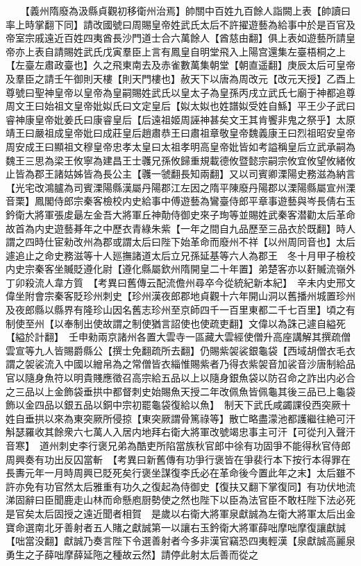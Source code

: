 　　【義州隋廢為汲縣貞觀初移衛州治焉】帥關中百姓九百餘人詣闕上表【帥讀曰率上時掌翻下同】請改國號曰周賜皇帝姓武氏太后不許擢遊藝為給事中於是百官及帝室宗戚遠近百姓四夷酋長沙門道士合六萬餘人【酋慈由翻】俱上表如遊藝所請皇帝亦上表自請賜姓武氏戊寅羣臣上言有鳳皇自明堂飛入上陽宫還集左臺梧桐之上【左臺左肅政臺也】久之飛東南去及赤雀數萬集朝堂【朝直遥翻】庚辰太后可皇帝及羣臣之請壬午御則天樓【則天門樓也】赦天下以唐為周改元【改元天授】乙酉上尊號曰聖神皇帝以皇帝為皇嗣賜姓武氏以皇太子為皇孫丙戌立武氏七廟于神都追尊周文王曰始祖文皇帝妣姒氏曰文定皇后【姒太姒也姓譜姒受姓自鯀】平王少子武曰睿神康皇帝妣姜氏曰康睿皇后【后遠祖姬周誣神甚矣文王其肯饗非鬼之祭乎】太原靖王曰嚴祖成皇帝妣曰成莊皇后趙肅恭王曰肅祖章敬皇帝魏義康王曰烈祖昭安皇帝周安成王曰顯祖文穆皇帝忠孝太皇曰太祖孝明高皇帝妣皆如考謚稱皇后立武承嗣為魏王三思為梁王攸寧為建昌王士彠兄孫攸歸重規載德攸暨懿宗嗣宗攸宜攸望攸緒攸止皆為郡王諸姑姊皆為長公主【彠一虢翻長知兩翻】又以司賓卿溧陽史務滋為納言【光宅改鴻臚為司賓溧陽縣漢屬丹陽郡江左因之隋平陳廢丹陽郡以溧陽縣屬宣州溧音栗】鳳閣侍郎宗秦客檢校内史給事中傅遊藝為鸞臺侍郎平章事遊藝與岑長倩右玉鈐衛大將軍張䖍朂左金吾大將軍丘神勣侍御史來子珣等並賜姓武秦客潜勸太后革命故首為内史遊藝朞年之中歷衣青綠朱紫【一年之間自九品歷至三品衣於既翻】時人謂之四時仕宦勑改州為郡或謂太后曰陛下始革命而廢州不祥【以州周同音也】太后遽追止之命史務滋等十人廵撫諸道太后立兄孫延基等六人為郡王　冬十月甲子檢校内史宗秦客坐贓貶遵化尉【遵化縣屬欽州隋開皇二十年置】弟楚客亦以姧贓流嶺外　丁卯殺流人韋方質　【考異曰舊傳云配流儋州尋卒今從統紀新本紀】　辛未内史邢文偉坐附會宗秦客貶珍州刺史【珍州漢夜郎郡地貞觀十六年開山洞以舊播州城置珍州及夜郎縣以縣界有隆珍山因名舊志珍州至京師四千一百里東都二千七百里】頃之有制使至州【以奉制出使故謂之制使猶言詔使也使疏吏翻】文偉以為誅己遽自縊死【縊於計翻】　壬申勑兩京諸州各置大雲寺一區藏大雲經使僧升高座講解其撰疏僧雲宣等九人皆賜爵縣公【撰士免翻疏所去翻】仍賜紫袈裟銀龜袋【西域胡僧衣毛衣謂之袈裟流入中國以繒帛為之常僧皆衣緇惟賜紫者乃得衣紫袈音加裟音沙唐制給品官以隨身魚符以明貴賤應徵召高宗給五品以上以隨身銀魚袋以防召命之詐出内必合之三品以上金飾袋垂拱中都督刺史始賜魚天授二年改佩魚皆佩龜其後三品已上龜袋飾以金四品以銀五品以銅中宗初罷龜袋復給以魚】　制天下武氏咸蠲課役西突厥十姓自垂拱以來為東突厥所侵掠【東突厥謂骨篤祿等】散亡略盡濛池都護繼往絶可汗斛瑟羅收其餘衆六七萬人入居内地拜右衛大將軍改號竭忠事主可汗【可從刋入聲汗音寒】　道州刺史李行褒兄弟為酷吏所陷當族秋官郎中徐有功固爭不能得秋官侍郎周興奏有功出反囚當斬　【考異曰新舊傳有功爭行褒皆在爭裴行本下按行本得罪在長夀元年一月時周興已貶死矣行褒坐謀復李氏必在革命後今置此年之末】太后雖不許亦免有功官然太后雅重有功久之復起為侍御史【復扶又翻下掌復同】有功伏地流涕固辭曰臣聞鹿走山林而命懸庖厨勢使之然也陛下以臣為法官臣不敢枉陛下法必死是官矣太后固授之遠近聞者相賀　是歲以右衛大將軍泉獻誠為左衛大將軍太后出金寶命選南北牙善射者五人賭之獻誠第一以讓右玉鈐衛大將軍薛咄摩咄摩復讓獻誠【咄當没翻】獻誠乃奏言陛下令選善射者今多非漢官竊恐四夷輕漢【泉獻誠高麗泉勇生之子薛咄摩薛延陁之種故云然】請停此射太后善而從之

